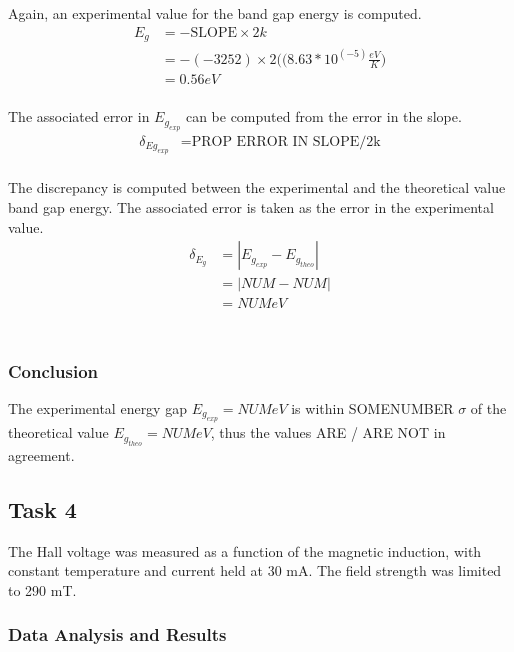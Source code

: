 \documentclass[a4paper]{article}
\begin{document}
Again, an experimental value for the band gap energy is computed.
\begin{align*}
E_g &= - \text{SLOPE} \times 2k \\
    &= - (-3252) \times 2 
       \Big( (8.63 *10^(-5) \frac{eV}{K} \Big) \\
    &= 0.56 eV \\
\end{align*}

The associated error in $E_{g_{exp}}$ can be computed from the error in the slope.
\begin{align*}
\delta_{Eg_{exp}} &= \text{PROP ERROR IN SLOPE/2k} \\
\end{align*}

\qq The discrepancy is computed between the experimental and the
theoretical value band gap energy. The associated error is taken as
the error in the experimental value.
\begin{align*}
\delta_{E_g} &= | E_{g_{exp}} - E_{g_{theo}} | \\
		     &= | NUM - NUM| \\
		     &= NUM eV \\
\end{align*}\\

\subsubsection{Conclusion}
\qq The experimental energy gap $E_{g_{exp}} = NUM eV$ is within
SOMENUMBER $\sigma$ of the theoretical value $E_{g_{theo}} = NUM eV$,
thus the values ARE / ARE NOT in agreement.

\subsection{Task 4}

\qq The Hall voltage was measured as a function of the magnetic
induction, with constant temperature and current held at 30 mA. 
The field strength was limited to 290 mT. 

\subsubsection{Data Analysis and Results}
\end{document}
